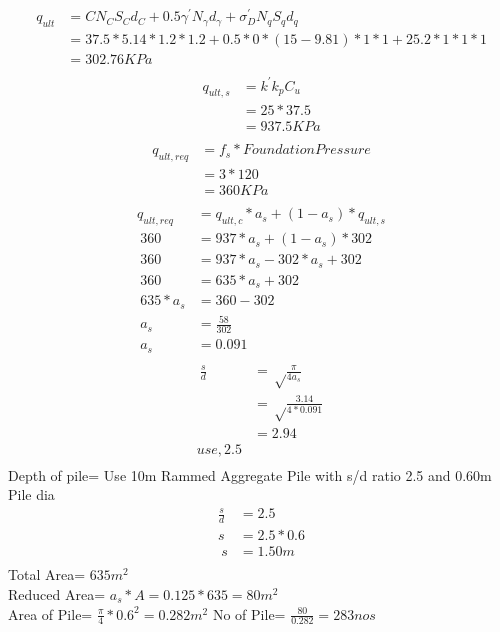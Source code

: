 \documentclass[12pt, a4paper]{article}
\begin{document}
\begin{align*}
\ q_{ult} &=CN_CS_Cd_C+0.5{\gamma^'}{N_\gamma}{d_\gamma}+{\sigma_D^'}{N_q}{S_q}{d_q}\\
  & =37.5*5.14*1.2*1.2+0.5*0*(15-9.81)*1*1+25.2*1*1*1\\
  & =302.76 KPa\\
\end{align*}
\begin{align*}
\ q_{ult,s} &={k^'}{k_p}{C_u}\\\
  & =25*37.5\\
  & =937.5KPa\\
\end{align*}
\begin{align*}
\ q_{ult,req} &=f_s*{Foundation Pressure}\\\
  & =3*120\\
  & =360 KPa\\
\end{align*}
\begin{align*}
\ q_{ult,req} &=q_{ult,c}*a_s+{(1-a_s)}*q_{ult,s}\\\
\ 360 &=937*a_s+{(1-a_s)}*302\\\
\ 360 &=937*a_s-302*a_s+302\\\
\ 360 &=635*a_s+302\\\
\ 635*a_s &=360-302\\\
\ a_s &=\frac{58}{302}\\\
\ a_s &=0.091\\\
\end{align*}
\begin{align*}
\ \frac{s}{d} &=\sqrt\frac{\pi}{4a_s}\\\
  & =\sqrt\frac{3.14}{4*0.091}\\\
  & =2.94\\use,  2.5\\
\end{align*}
Depth of pile= Use 10m Rammed Aggregate Pile with s/d ratio 2.5 and 0.60m Pile dia
\begin{align*}
\ \frac{s}{d} &=2.5\\
\ s  &=2.5*0.6\\\
\ s  &=1.50m\\\
\end{align*}
Total Area= $635m^2$\\
Reduced Area= $a_s*A=0.125*635=80m^2$\\
Area of Pile= $\frac{\pi}{4}*0.6^2=0.282m^2$
No of Pile= $\frac{80}{0.282}=283nos$\\
\end{document}
